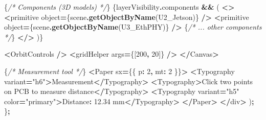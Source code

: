 \documentclass[
]{article}
\newenvironment{Shaded}{\begin{snugshade}}{\end{snugshade}}
\newcommand{\AttributeTok}[1]{\textcolor[rgb]{0.13,0.29,0.53}{#1}}
\newcommand{\CommentTok}[1]{\textcolor[rgb]{0.56,0.35,0.01}{\textit{#1}}}
\newcommand{\DataTypeTok}[1]{\textcolor[rgb]{0.13,0.29,0.53}{#1}}
\newcommand{\DecValTok}[1]{\textcolor[rgb]{0.00,0.00,0.81}{#1}}
\newcommand{\FloatTok}[1]{\textcolor[rgb]{0.00,0.00,0.81}{#1}}
\newcommand{\FunctionTok}[1]{\textcolor[rgb]{0.13,0.29,0.53}{\textbf{#1}}}
\newcommand{\NormalTok}[1]{#1}
\newcommand{\OperatorTok}[1]{\textcolor[rgb]{0.81,0.36,0.00}{\textbf{#1}}}
\newcommand{\StringTok}[1]{\textcolor[rgb]{0.31,0.60,0.02}{#1}}
\begin{document}
\begin{Shaded}
\begin{Highlighting}[]
\NormalTok{        \{}\CommentTok{/* Components (3D models) */}\NormalTok{\}}
\NormalTok{        \{layerVisibility}\OperatorTok{.}\AttributeTok{components} \OperatorTok{\&\&}\NormalTok{ (}
          \OperatorTok{\textless{}\textgreater{}}
            \OperatorTok{\textless{}}\NormalTok{primitive }\DataTypeTok{object}\OperatorTok{=}\NormalTok{\{scene}\OperatorTok{.}\FunctionTok{getObjectByName}\NormalTok{(}\StringTok{\textquotesingle{}U2\_Jetson\textquotesingle{}}\NormalTok{)\} }\OperatorTok{/\textgreater{}}
            \OperatorTok{\textless{}}\NormalTok{primitive }\DataTypeTok{object}\OperatorTok{=}\NormalTok{\{scene}\OperatorTok{.}\FunctionTok{getObjectByName}\NormalTok{(}\StringTok{\textquotesingle{}U3\_EthPHY\textquotesingle{}}\NormalTok{)\} }\OperatorTok{/\textgreater{}}
\NormalTok{            \{}\CommentTok{/* ... other components */}\NormalTok{\}}
          \OperatorTok{\textless{}/\textgreater{}}
\NormalTok{        )\}}

        \OperatorTok{\textless{}}\NormalTok{OrbitControls }\OperatorTok{/\textgreater{}}
        \OperatorTok{\textless{}}\NormalTok{gridHelper args}\OperatorTok{=}\NormalTok{\{[}\DecValTok{200}\OperatorTok{,} \DecValTok{20}\NormalTok{]\} }\OperatorTok{/\textgreater{}}
      \OperatorTok{\textless{}/}\NormalTok{Canvas}\OperatorTok{\textgreater{}}

\NormalTok{      \{}\CommentTok{/* Measurement tool */}\NormalTok{\}}
      \OperatorTok{\textless{}}\NormalTok{Paper sx}\OperatorTok{=}\NormalTok{\{\{ p}\OperatorTok{:} \DecValTok{2}\OperatorTok{,}\NormalTok{ mt}\OperatorTok{:} \DecValTok{2}\NormalTok{ \}\}}\OperatorTok{\textgreater{}}
        \OperatorTok{\textless{}}\NormalTok{Typography variant}\OperatorTok{=}\StringTok{"h6"}\OperatorTok{\textgreater{}}\NormalTok{Measurement}\OperatorTok{\textless{}/}\NormalTok{Typography}\OperatorTok{\textgreater{}}
        \OperatorTok{\textless{}}\NormalTok{Typography}\OperatorTok{\textgreater{}}\NormalTok{Click two points on PCB to measure distance}\OperatorTok{\textless{}/}\NormalTok{Typography}\OperatorTok{\textgreater{}}
        \OperatorTok{\textless{}}\NormalTok{Typography variant}\OperatorTok{=}\StringTok{"h5"}\NormalTok{ color}\OperatorTok{=}\StringTok{"primary"}\OperatorTok{\textgreater{}}\NormalTok{Distance}\OperatorTok{:} \FloatTok{12.34}\NormalTok{ mm}\OperatorTok{\textless{}/}\NormalTok{Typography}\OperatorTok{\textgreater{}}
      \OperatorTok{\textless{}/}\NormalTok{Paper}\OperatorTok{\textgreater{}}
    \OperatorTok{\textless{}/}\NormalTok{div}\OperatorTok{\textgreater{}}
\NormalTok{  )}\OperatorTok{;}
\NormalTok{\}}\OperatorTok{;}
\end{Highlighting}
\end{Shaded}
\end{document}
